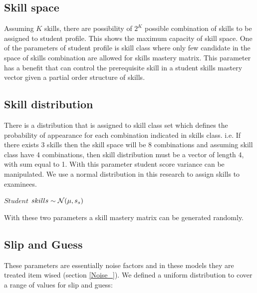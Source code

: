  
\subsection{Skill space}
Assuming $K$ skills, there are possibility of $2^K$ possible combination of skills to be assigned to student profile. This shows the maximum capacity of skill space. One of the parameters of student profile is skill class where only few candidate in the space of skills combination are allowed for skills mastery matrix. This parameter has a benefit that can control the prerequisite skill in a student skills mastery vector given a partial order structure of skills.

\subsection{Skill distribution}

There is a distribution that is assigned to skill class set which defines the probability of appearance for each combination indicated in skills class. i.e. If there exists 3 skills then the skill space will be 8 combinations and assuming skill class have 4 combinations, then skill distribution  must be a vector of length 4, with sum equal to 1. With this parameter student score variance can be manipulated. We use a normal distribution in this research to assign skills to examinees.



\begin{center}
$Student$  $skills \sim \mathcal{N}(\mu, s_s)$
\end{center}

With these two parameters a skill mastery matrix can be generated randomly.

\subsection{Slip and Guess}
These parameters are essentially noise factors and in these models they are treated item wised (section \ref{Noise_}). We defined a uniform distribution to cover a range of values for slip and guess:


